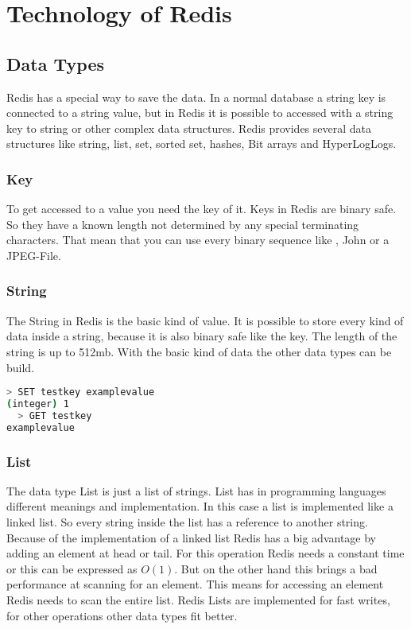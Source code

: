 
\section{Technology of Redis}
\subsection{Data Types}
Redis has a special way to save the data. In a normal database a string key is connected to a string value, but in Redis it is possible to accessed with a string key to string or other complex data structures. Redis provides several data structures like string, list, set, sorted set, hashes, Bit arrays and HyperLogLogs. \cite{RedisIntroDataTypes}

\subsubsection{Key} 
To get accessed to a value you need the key of it. Keys in Redis are binary safe. So they have a known length not determined by any special terminating characters. That mean that you can use every binary sequence like \grqq, \grqq John\grqq{ } or a JPEG-File.

\subsubsection{String} 
The String in Redis is the basic kind of value. It is possible to store every kind of data inside a string, because it is also binary safe like the key. The length of the string is up to 512mb. With the basic kind of data the other data types can be build. 

\begin{lstlisting}[language=bash]
  > SET testkey examplevalue
(integer) 1 
  > GET testkey
examplevalue
\end{lstlisting}

\subsubsection{List}
The data type List is just a list of strings. List has in programming languages different meanings and implementation. In this case a list is implemented like a linked list. So every string inside the list has a reference to another string. Because of the implementation of a linked list Redis has a big advantage by adding an element at head or tail. For this operation Redis needs a constant time or this can be expressed as $O(1)$. But on the other hand this brings a bad performance at scanning for an element. This means for accessing an element Redis needs to scan the entire list. Redis Lists are implemented for fast writes, for other operations other data types fit better. 
\cite{das2015learning} 

